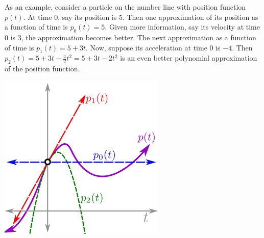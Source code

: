 \documentclass[twoside,openright,titlepage,a4paper]{book}
\begin{document}
\begin{sloppypar}
As an example, consider a particle on the number line with position function $p(t)$. At time 0, say its position is 5. Then one approximation of its position as a function of time is ${p_0(t)=5}$. Given more information, say its velocity at time 0 is 3, the approximation becomes better. The next approximation as a function of time is ${p_1(t)=5+3t}$. Now, suppose its acceleration at time 0 is $-4$. Then ${p_2(t)=5+3t-\frac{4}{2}t^2=5+3t-2t^2}$ is an even better polynomial approximation of the position function.
\begin{center}
	\includegraphics[scale=0.6]{Approximants}
\end{center}


\end{sloppypar}
\end{document}
